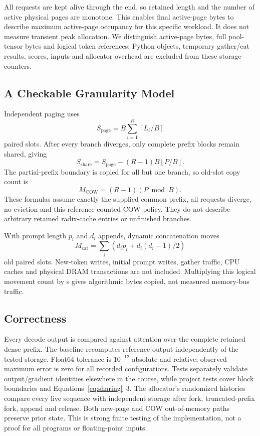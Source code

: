 \documentclass{article}
\begin{document}
All requests are kept alive through the end, so retained length and the number of active physical pages are monotone. This enables final active-page bytes to describe maximum active-page occupancy for this specific workload. It does not measure transient peak allocation. We distinguish active-page bytes, full pool-tensor bytes and logical token references; Python objects, temporary gather/cat results, scores, inputs and allocator overhead are excluded from these storage counters.

\subsection{A Checkable Granularity Model}
Independent paging uses
\begin{equation}
S_{\mathrm{page}}=B\sum_{i=1}^{R}\left\lceil L_i/B\right\rceil
\end{equation}
paired slots. After every branch diverges, only complete prefix blocks remain shared, giving
\begin{equation}
S_{\mathrm{share}}=S_{\mathrm{page}}-(R-1)B\left\lfloor P/B\right\rfloor.
\label{eq:sharing}
\end{equation}
The partial-prefix boundary is copied for all but one branch, so old-slot copy count is
\begin{equation}
M_{\mathrm{COW}}=(R-1)(P\bmod B).
\end{equation}
These formulas assume exactly the supplied common prefix, all requests diverge, no eviction and this reference-counted COW policy. They do not describe arbitrary retained radix-cache entries or unfinished branches.

With prompt length $p_i$ and $d_i$ appends, dynamic concatenation moves
\begin{equation}
M_{\mathrm{cat}}=\sum_i\left(d_i p_i+d_i(d_i-1)/2\right)
\end{equation}
old paired slots. New-token writes, initial prompt writes, gather traffic, CPU caches and physical DRAM transactions are not included. Multiplying this logical movement count by s gives algorithmic bytes copied, not measured memory-bus traffic.

\subsection{Correctness}
Every decode output is compared against attention over the complete retained dense prefix. The baseline recomputes reference output independently of the tested storage. Float64 tolerance is $10^{-12}$ absolute and relative; observed maximum error is zero for all recorded configurations. Tests separately validate output/gradient identities elsewhere in the course, while project tests cover block boundaries and Equations~\ref{eq:sharing}--3. The allocator's randomized histories compare every live sequence with independent storage after fork, truncated-prefix fork, append and release. Both new-page and COW out-of-memory paths preserve prior state. This is strong finite testing of the implementation, not a proof for all programs or floating-point inputs.
\end{document}
